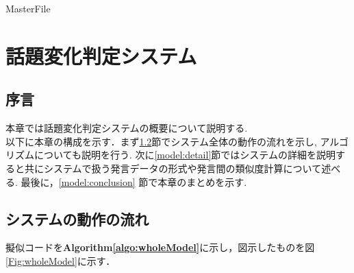 \expandafter\ifx\csname MasterFile\endcsname\relax
	\def\SubFile{hoge}
  
  
	\setcounter{chapter}{2}
  \fi
  \cleardoublepage
\chapter{話題変化判定システム}
%
\label{model:chapter}

\section{序言}
\label{model:introduction}
本章では話題変化判定システムの概要について説明する. \\
以下に本章の構成を示す．まず\ref{model:wholeModel}節でシステム全体の動作の流れを示し, アルゴリズムについても説明を行う. 次に\ref{model:detail}節ではシステムの詳細を説明すると共にシステムで扱う発言データの形式や発言間の類似度計算について述べる. 
最後に，\ref{model:conclusion} 節で本章のまとめを示す.

\section{システムの動作の流れ}
\label{model:wholeModel}
擬似コードを\textbf{Algorithm\ref{algo:wholeModel}}に示し，図示したものを図\ref{Fig:wholeModel}に示す．

